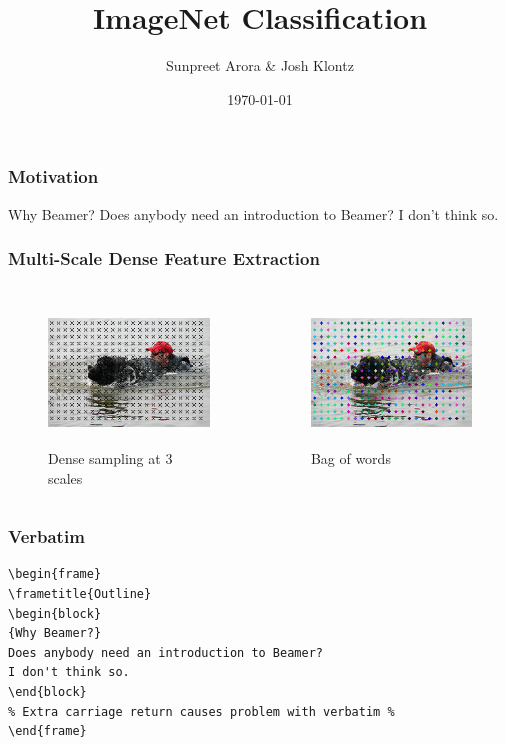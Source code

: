 \documentclass{beamer}
\title[ImageNet]{ImageNet Classification}
\author{Sunpreet Arora \& Josh Klontz}
\date{\today}
\begin{document}
%
\begin{frame}
\titlepage
\end{frame}
%
\begin{frame}
\frametitle{Motivation}
\begin{block}
{Why Beamer?}
Does anybody need an introduction to Beamer? I don't think so.
\end{block}
\end{frame}
%
\begin{frame}
\frametitle{Multi-Scale Dense Feature Extraction}
\begin{columns}
\begin{column}{.5\textwidth}
\begin{figure}
\includegraphics[height=1.5in]{dog_intdet}
\caption{Dense sampling at 3 scales}
\end{figure}
\end{column}
\pause
\begin{column}{.5\textwidth}
\begin{figure}
\includegraphics[height=1.5in]{dog_quantized}
\caption{Bag of words}
\end{figure}
\end{column}
\end{columns}
\end{frame}
%
\begin{frame}[fragile] %
\frametitle{Verbatim}
\begin{example}
\begin{verbatim}
\begin{frame}
\frametitle{Outline}
\begin{block}
{Why Beamer?}
Does anybody need an introduction to Beamer?
I don't think so.
\end{block}
% Extra carriage return causes problem with verbatim %
\end{frame}\end{verbatim} 
\end{example}
\end{frame}
 
\end{document}
